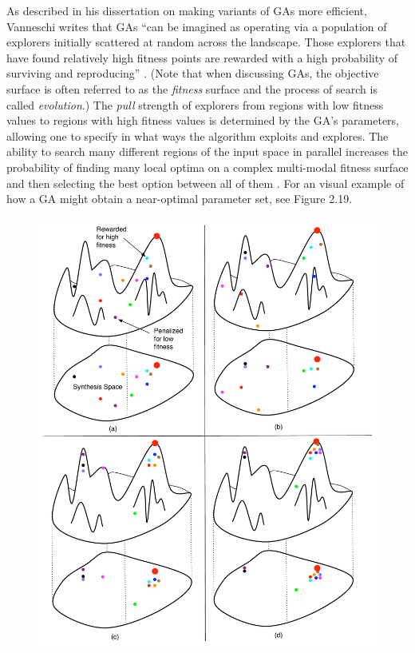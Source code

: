 \documentclass[a4paper,12pt]{report} 	%
\numberwithin{figure}{chapter}
\numberwithin{table}{chapter}
\numberwithin{equation}{chapter}
\begin{document}
\begin{flushleft}
As described in his dissertation on making variants of GAs more efficient, Vanneschi writes that GAs ``can be imagined as operating via a population of explorers initially scattered at random across the landscape. Those explorers that have found relatively high fitness points are rewarded with a high probability of surviving and reproducing'' \cite[p. 70]{Vanneschi:2004le}. (Note that when discussing GAs, the objective surface is often referred to as the \emph{fitness} surface and the process of search is called \emph{evolution}.) The \emph{pull} strength of explorers from regions with low fitness values to regions with high fitness values is determined by the GA's parameters, allowing one to specify in what ways the algorithm exploits and explores. The ability to search many different regions of the input space in parallel increases the probability of finding many local optima on a complex multi-modal fitness surface and then selecting the best option between all of them \cite[p. 37]{Garcia:2001jw}. For an visual example of how a GA might obtain a near-optimal parameter set, see Figure 2.19.
\\
\begin{figure}[h!]
\begin{center}
\includegraphics[scale=0.50]{GASearch}

\end{center}
\end{figure}
\end{flushleft}
\end{document}
